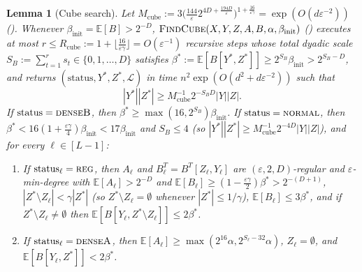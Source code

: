 \documentclass[11pt]{article}
\newtheorem{lemma}[theorem]{Lemma}
\theoremstyle{definition}
\renewcommand{\label}[1]{}%
\newcommand{\E}{\mathbb{E}}
\newcommand{\abs}[1]{\left\lvert #1 \right\rvert}
\newcommand{\dens}[1]{\E[#1]}
\newcommand{\FindCube}{\textnormal{\textsc{FindCube}}}
\newcommand{\tagreg}{\textnormal{\textsc{reg}}}
\newcommand{\tagdenseA}{\textnormal{\textsc{denseA}}}
\newcommand{\tagdenseB}{\textnormal{\textsc{denseB}}}
\newcommand{\tagnormal}{\textnormal{\textsc{normal}}}
\begin{document}
\begin{lemma}[Cube search]
\label{lem:cube-step}
Let $M_{\text{cube}} := 3\big(\frac{144}{\varepsilon} 2^{4D + \frac{194 D}{\varepsilon}}\big)^{1 + \frac{16}{\varepsilon\gamma}} = \exp(O(d\varepsilon^{-2}))$ (). Whenever $\beta_{\text{init}} = \dens{B} > 2^{-D}$, $\FindCube(X, Y, Z, A, B, \alpha, \beta_{\text{init}})$ () executes at most $r \le R_{\text{cube}} := 1 + \lfloor \frac{16}{\varepsilon\gamma} \rfloor = O(\varepsilon^{-1})$ recursive steps whose total dyadic scale $S_B := \sum_{t=1}^r s_t \in \{0, 1, \dots, D\}$ satisfies $\beta^* := \dens{B[Y^*, Z^*]} \ge 2^{S_B}\beta_{\text{init}} > 2^{S_B - D}$, and returns $(\text{status}, Y^*, Z^*, \mathcal{L})$ in time $n^2 \exp(O(d^2 + d\varepsilon^{-2}))$ such that
\begin{equation}\label{eq:goodcube-M}
    \abs{Y^*}\abs{Z^*} \ge M_{\text{cube}}^{-1} 2^{-S_B D}\abs{Y}\abs{Z}.
\end{equation}
If $\text{status} = \tagdenseB$, then $\beta^* \ge \max(16, 2^{S_B})\beta_{\text{init}}$. If $\text{status} = \tagnormal$, then $\beta^* < 16(1 + \frac{\varepsilon\gamma}{4})\beta_{\text{init}} < 17\beta_{\text{init}}$ and $S_B \le 4$ (so $\abs{Y^*}\abs{Z^*} \ge M_{\text{cube}}^{-1} 2^{-4D}\abs{Y}\abs{Z}$), and for every $\ell \in [L-1]$:
\begin{enumerate}[leftmargin=*]
    \item If $\text{status}_\ell = \tagreg$, then $A_\ell$ and $B_\ell^T = B^T[Z_\ell, Y_\ell]$ are $(\varepsilon, 2, D)$-regular and $\varepsilon$-min-degree with $\dens{A_\ell} > 2^{-D}$ and $\dens{B_\ell} \ge (1 - \frac{\varepsilon\gamma}{2})\beta^* > 2^{-(D+1)}$, $\abs{Z^* \setminus Z_\ell} < \gamma\abs{Z^*}$ (so $Z^* \setminus Z_\ell = \emptyset$ whenever $\abs{Z^*} \le 1/\gamma$), $\dens{B_\ell} \le 3\beta^*$, and if $Z^* \setminus Z_\ell \ne \emptyset$ then $\dens{B[Y_\ell, Z^* \setminus Z_\ell]} \le 2\beta^*$.
    \item If $\text{status}_\ell = \tagdenseA$, then $\dens{A_\ell} \ge \max(2^{16}\alpha, 2^{S_\ell - 32}\alpha)$, $Z_\ell = \emptyset$, and $\dens{B[Y_\ell, Z^*]} < 2\beta^*$.
\end{enumerate}
\end{lemma}
\end{document}
